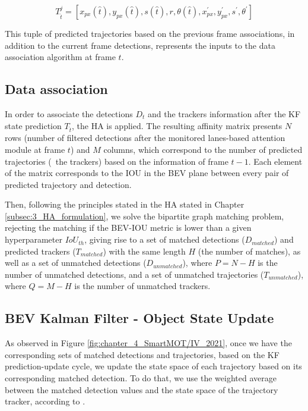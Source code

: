 \begin{equation}
	\label{est}
	T_{\hat{t}}^{j} = [x_{px}(\hat{t}),y_{px}(\hat{t}),s(\hat{t}),r,\theta(\hat{t}),x_{px}^{'},y_{px}^{'},s^{'},\theta^{'}]
\end{equation}

This tuple of predicted trajectories based on the previous frame associations, in addition to the current frame detections, represents the inputs to the data association algorithm at frame $t$.

\subsection{Data association}
\label{subsec:4_smartmot_data_association}

In order to associate the detections $D_{t}$ and the trackers information after the \ac{KF} state prediction $T_{\hat{t}}$, the \acf{HA} is applied. The resulting affinity matrix presents $N$ rows (number of filtered detections after the monitored lanes-based attention module at frame $t$) and $M$ columns, which correspond to the number of predicted trajectories (\ie \ the trackers) based on the information of frame $t-1$. Each element of the matrix corresponds to the \ac{IOU} in the \ac{BEV} plane between every pair of predicted trajectory and detection. 

Then, following the principles stated in the \ac{HA} stated in Chapter \ref{subsec:3_HA_formulation}, we solve the bipartite graph matching problem, rejecting the matching if the \ac{BEV}-\ac{IOU} metric is lower than a given hyperparameter $IoU_{th}$, giving rise to a set of matched detections ($D_{matched}$) and predicted trackers ($T_{matched}$) with the same length $H$ (the number of matches), as well as a set of unmatched detections ($D_{unmatched}$), where $P = N - H$ is the number of unmatched detections, and a set of unmatched trajectories ($T_{unmatched}$), where $Q = M - H$ is the number of unmatched trackers.

\subsection{BEV Kalman Filter - Object State Update}
\label{subsec:4_smartmot_data_state_update}

As observed in Figure \ref{fig:chapter_4_SmartMOT/IV_2021}, once we have the corresponding sets of matched detections and trajectories, based on the \ac{KF} prediction-update cycle, we update the state space of each trajectory based on its corresponding matched detection. To do that, we use the weighted average between the matched detection values and the state space of the trajectory tracker, according to \cite{kalman1960new}. 

